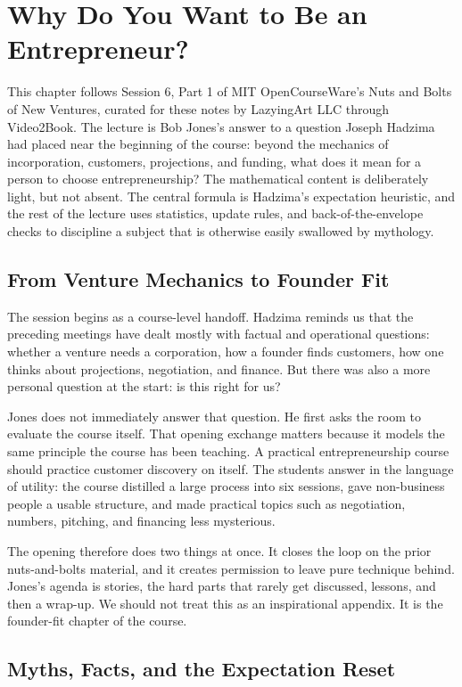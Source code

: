 \chapter{Why Do You Want to Be an Entrepreneur?}

This chapter follows Session 6, Part 1 of MIT OpenCourseWare's Nuts and Bolts of New Ventures, curated for these notes by LazyingArt LLC through Video2Book. The lecture is Bob Jones's answer to a question Joseph Hadzima had placed near the beginning of the course: beyond the mechanics of incorporation, customers, projections, and funding, what does it mean for a person to choose entrepreneurship? The mathematical content is deliberately light, but not absent. The central formula is Hadzima's expectation heuristic, and the rest of the lecture uses statistics, update rules, and back-of-the-envelope checks to discipline a subject that is otherwise easily swallowed by mythology.

\section{From Venture Mechanics to Founder Fit}

The session begins as a course-level handoff. Hadzima reminds us that the preceding meetings have dealt mostly with factual and operational questions: whether a venture needs a corporation, how a founder finds customers, how one thinks about projections, negotiation, and finance. But there was also a more personal question at the start: is this right for us?

Jones does not immediately answer that question. He first asks the room to evaluate the course itself. That opening exchange matters because it models the same principle the course has been teaching. A practical entrepreneurship course should practice customer discovery on itself. The students answer in the language of utility: the course distilled a large process into six sessions, gave non-business people a usable structure, and made practical topics such as negotiation, numbers, pitching, and financing less mysterious.

The opening therefore does two things at once. It closes the loop on the prior nuts-and-bolts material, and it creates permission to leave pure technique behind. Jones's agenda is stories, the hard parts that rarely get discussed, lessons, and then a wrap-up. We should not treat this as an inspirational appendix. It is the founder-fit chapter of the course.

\section{Myths, Facts, and the Expectation Reset}

